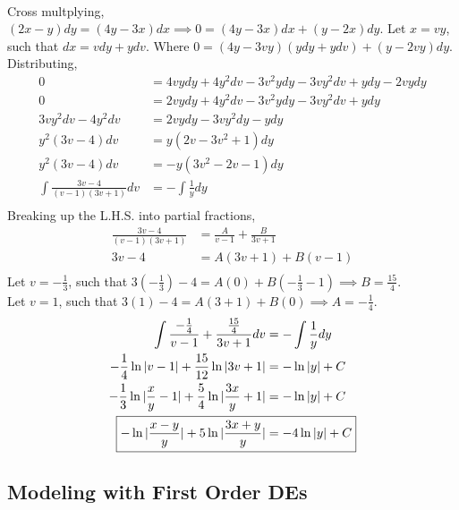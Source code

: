 \documentclass{article}
\begin{document}
\sol \\
Cross multplying, $(2x-y) dy = (4y-3x)dx \implies 0 = (4y-3x)dx + (y-2x)dy$.
Let $x=vy$, such that $dx = vdy + ydv$. Where $0 = (4y-3vy)(ydy+ydv) + (y-2vy)dy$.
Distributing,
\begin{align*}
  0 &= 4vydy+4y^2dv-3v^2ydy-3vy^2dv+ydy-2vydy \\
  0 &= 2vydy + 4y^2dv-3v^2ydy-3vy^2dv+ydy \\
  3vy^2dv-4y^2dv &= 2vydy-3vy^2dy-ydy \\
  y^2(3v-4)dv &= y(2v-3v^2+1)dy \\ 
  y^2(3v-4)dv &= -y(3v^2-2v-1) dy \\
  \int \frac{3v-4}{(v-1)(3v+1)} dv &= -\int \frac{1}{y} dy \\
\end{align*}
Breaking up the L.H.S. into partial fractions,
\begin{align*}
  \frac{3v-4}{(v-1)(3v+1)} &= \frac{A}{v-1} + \frac{B}{3v+1} \\
  3v-4 &= A(3v+1) + B(v-1) \\
\end{align*}
Let $v = -\frac{1}{3}$, such that $3(-\frac{1}{3})-4=A(0)+B(-\frac{1}{3}-1) \implies B = \frac{15}{4}$. \\
Let $v = 1$, such that $3(1)-4=A(3+1)+B(0) \implies A = -\frac{1}{4}$. \\
\begin{align*}
  \int \frac{-\frac{1}{4}}{v-1} + \frac{\frac{15}{4}}{3v+1} dv &= -\int \frac{1}{y} dy \\
  -\frac{1}{4} \ln|v-1| + \frac{15}{12} \ln|3v+1| &= -\ln|y| + C \\
  -\frac{1}{3} \ln|\frac{x}{y} - 1| + \frac{5}{4} \ln|\frac{3x}{y}+1| &= -\ln|y| + C \\
  \Aboxed{-\ln|\frac{x-y}{y}| + 5 \ln|\frac{3x+y}{y}| &= -4\ln|y| + C} \\
\end{align*}

\subsection{Modeling with First Order DEs}

\end{document}
